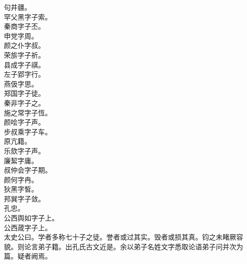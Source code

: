 \documentclass{zhvt-classic}
\begin{document}
\hspace*{2em}句井疆。\\
\hspace*{2em}罕父黑字子索。\\
\hspace*{2em}秦商字子丕。\\
\hspace*{2em}申党字周。\\
\hspace*{2em}颜之仆字叔。\\
\hspace*{2em}荣旂字子祈。\\
\hspace*{2em}县成字子祺。\\
\hspace*{2em}左子郢字行。\\
\hspace*{2em}燕伋字思。\\
\hspace*{2em}郑国字子徒。\\
\hspace*{2em}秦非字子之。\\
\hspace*{2em}施之常字子恆。\\
\hspace*{2em}颜哙字子声。\\
\hspace*{2em}步叔乘字子车。\\
\hspace*{2em}原亢籍。\\
\hspace*{2em}乐欬字子声。\\
\hspace*{2em}廉絜字庸。\\
\hspace*{2em}叔仲会字子期。\\
\hspace*{2em}颜何字冉。\\
\hspace*{2em}狄黑字皙。\\
\hspace*{2em}邦巽字子敛。\\
\hspace*{2em}孔忠。\\
\hspace*{2em}公西舆如字子上。\\
\hspace*{2em}公西葴字子上。\\
\hspace*{2em}太史公曰。学者多称七十子之徒。誉者或过其实。毁者或损其真。钧之未睹厥容貌。则论言弟子籍。出孔氏古文近是。余以弟子名姓文字悉取论语弟子问并次为篇。疑者阙焉。\\
\end{document}
